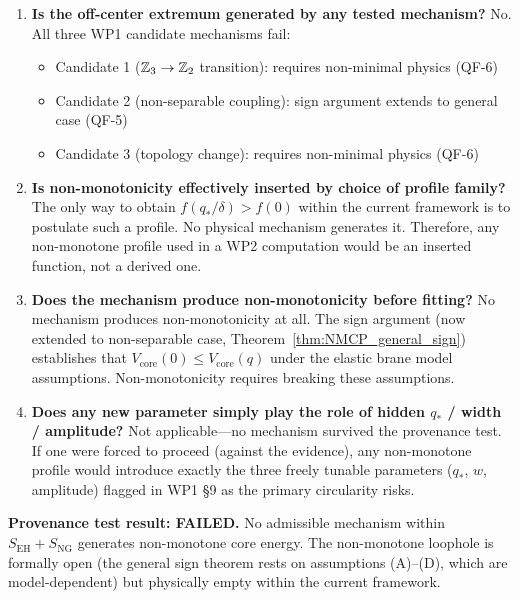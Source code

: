 \begin{enumerate}
    \item \textbf{Is the off-center extremum generated by any tested
          mechanism?}
          No. All three WP1 candidate mechanisms fail:
          \begin{itemize}
              \item Candidate 1 ($\mathbb{Z}_3 \to \mathbb{Z}_2$ transition):
                    requires non-minimal physics (QF-6)
              \item Candidate 2 (non-separable coupling):
                    sign argument extends to general case (QF-5)
              \item Candidate 3 (topology change):
                    requires non-minimal physics (QF-6)
          \end{itemize}

    \item \textbf{Is non-monotonicity effectively inserted by choice of
          profile family?}
          The only way to obtain $f(q_*/\delta) > f(0)$ within the
          current framework is to postulate such a profile. No physical
          mechanism generates it. Therefore, any non-monotone profile
          used in a WP2 computation would be an inserted function,
          not a derived one.

    \item \textbf{Does the mechanism produce non-monotonicity before
          fitting?}
          No mechanism produces non-monotonicity at all. The sign
          argument (now extended to non-separable case,
          Theorem~\ref{thm:NMCP_general_sign}) establishes that
          $V_{\mathrm{core}}(0) \leq V_{\mathrm{core}}(q)$ under the
          elastic brane model assumptions. Non-monotonicity requires
          breaking these assumptions.

    \item \textbf{Does any new parameter simply play the role of hidden
          $q_*$ / width / amplitude?}
          Not applicable---no mechanism survived the provenance test.
          If one were forced to proceed (against the evidence), any
          non-monotone profile would introduce exactly the three
          freely tunable parameters ($q_*$, $w$, amplitude) flagged
          in WP1 \S9 as the primary circularity risks.
\end{enumerate}

\textbf{Provenance test result: FAILED.} No admissible mechanism within
$S_{\mathrm{EH}} + S_{\mathrm{NG}}$ generates non-monotone core
energy. The non-monotone loophole is formally open (the general sign
theorem rests on assumptions (A)--(D), which are model-dependent) but
physically empty within the current framework.

